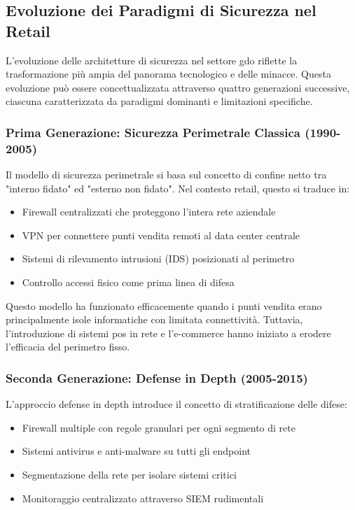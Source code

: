 \subsection{\texorpdfstring{Evoluzione dei Paradigmi di Sicurezza nel Retail}{2.4.1 - Evoluzione dei Paradigmi di Sicurezza nel Retail}}
\label{subsec:2.4.1_evoluzione}

L'evoluzione delle architetture di sicurezza nel settore \gls{gdo} riflette la trasformazione più ampia del panorama tecnologico e delle minacce. Questa evoluzione può essere concettualizzata attraverso quattro generazioni successive, ciascuna caratterizzata da paradigmi dominanti e limitazioni specifiche.

\subsubsection{Prima Generazione: Sicurezza Perimetrale Classica (1990-2005)}

Il modello di sicurezza perimetrale si basa sul concetto di confine netto tra "interno fidato" ed "esterno non fidato". Nel contesto retail, questo si traduce in:

\begin{itemize}
\item Firewall centralizzati che proteggono l'intera rete aziendale
\item VPN per connettere punti vendita remoti al data center centrale
\item Sistemi di rilevamento intrusioni (IDS) posizionati al perimetro
\item Controllo accessi fisico come prima linea di difesa
\end{itemize}

Questo modello ha funzionato efficacemente quando i punti vendita erano principalmente isole informatiche con limitata connettività. Tuttavia, l'introduzione di sistemi \gls{pos} in rete e l'e-commerce hanno iniziato a erodere l'efficacia del perimetro fisso.

\subsubsection{Seconda Generazione: Defense in Depth (2005-2015)}

L'approccio defense in depth introduce il concetto di stratificazione delle difese:

\begin{itemize}
\item Firewall multiple con regole granulari per ogni segmento di rete
\item Sistemi antivirus e anti-malware su tutti gli endpoint
\item Segmentazione della rete per isolare sistemi critici
\item Monitoraggio centralizzato attraverso SIEM rudimentali
\end{itemize}


